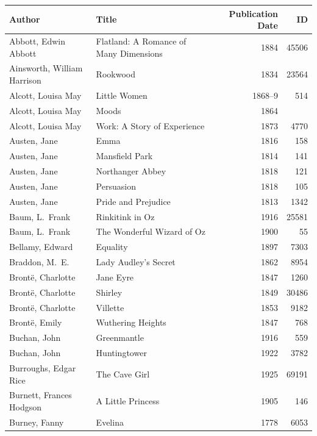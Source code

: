 \documentclass{article} %
\begin{document}
\begin{center}
\renewcommand{\arraystretch}{1.3}
\begin{tabularx}{\linewidth}{RRrr}
    \toprule
    \textbf{Author} & \textbf{Title} & \textbf{Publication Date} & \textbf{ID} \\
    \midrule
    \endhead
    \bottomrule
    \endfoot
    Abbott, Edwin Abbott & Flatland: A Romance of Many Dimensions & 1884 & 45506 \\
    Ainsworth, William Harrison & Rookwood & 1834 & 23564 \\
    Alcott, Louisa May & Little Women & 1868--9 & 514  \\
    Alcott, Louisa May & Moods & 1864 \\
    Alcott, Louisa May & Work: A Story of Experience & 1873 & 4770 \\
    Austen, Jane & Emma & 1816 & 158 \\
    Austen, Jane & Mansfield Park & 1814 & 141 \\
    Austen, Jane & Northanger Abbey & 1818 & 121 \\
    Austen, Jane & Persuasion & 1818 & 105 \\
    Austen, Jane & Pride and Prejudice & 1813 & 1342 \\
    Baum, L.\ Frank & Rinkitink in Oz & 1916 & 25581 \\
    Baum, L.\ Frank & The Wonderful Wizard of Oz & 1900 & 55 \\
    Bellamy, Edward & Equality & 1897 & 7303 \\
    Braddon, M.\ E.\ & Lady Audley's Secret & 1862 & 8954 \\
    Bront\"e, Charlotte & Jane Eyre & 1847 & 1260 \\
    Bront\"e, Charlotte & Shirley & 1849 & 30486 \\
    Bront\"e, Charlotte & Villette & 1853 & 9182 \\
    Bront\"e, Emily & Wuthering Heights & 1847 & 768 \\
    Buchan, John & Greenmantle & 1916 & 559 \\
    Buchan, John & Huntingtower & 1922 & 3782 \\
    Burroughs, Edgar Rice & The Cave Girl & 1925 & 69191 \\
    Burnett, Frances Hodgson & A Little Princess & 1905 & 146 \\
    Burney, Fanny & Evelina & 1778 & 6053 \\

\end{tabularx}
\end{center}
\end{document}
